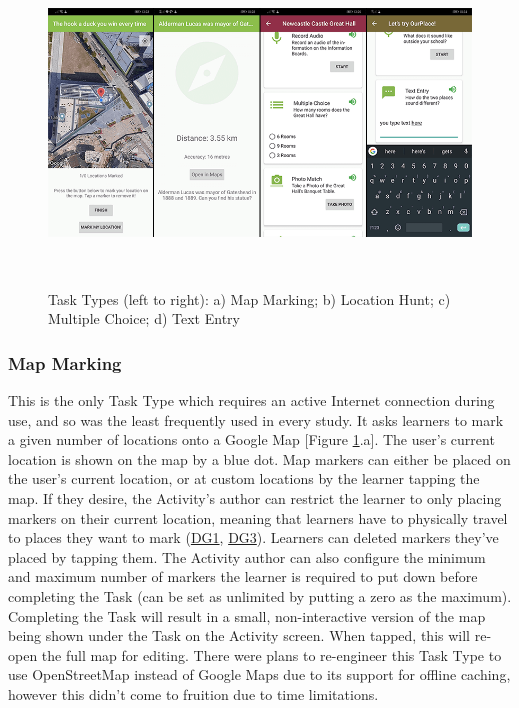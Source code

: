 \begin{figure}
  \centering
  \includegraphics[width=1\columnwidth]{images/chapter05/tasktypes3.png}
  \caption[Task Types (part 3)]{Task Types (left to right): a) Map Marking; b) Location Hunt; c) Multiple Choice; d) Text Entry}~\label{fig:TaskTypes3}
\end{figure}

\subsubsection*{Map Marking}
This is the only Task Type which requires an active Internet connection during use, and so was the least frequently used in every study. It asks learners to mark a given number of locations onto a Google Map [Figure \ref{fig:TaskTypes3}.a]. The user's current location is shown on the map by a blue dot. Map markers can either be placed on the user's current location, or at custom locations by the learner tapping the map. If they desire, the Activity's author can restrict the learner to only placing markers on their current location, meaning that learners have to physically travel to places they want to mark (\hyperref[DG1]{DG1}, \hyperref[DG3]{DG3}). Learners can deleted markers they've placed by tapping them. The Activity author can also configure the minimum and maximum number of markers the learner is required to put down before completing the Task (can be set as unlimited by putting a zero as the maximum). Completing the Task will result in a small, non-interactive version of the map being shown under the Task on the Activity screen. When tapped, this will re-open the full map for editing. There were plans to re-engineer this Task Type to use OpenStreetMap instead of Google Maps due to its support for offline caching, however this didn't come to fruition due to time limitations.

